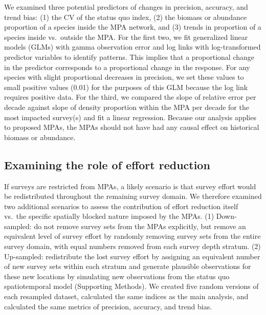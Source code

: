 \documentclass[12pt]{article}
\begin{document}
We examined three potential predictors of changes in precision, accuracy, and trend bias:
(1) the CV of the status quo index, (2) the biomass or abundance proportion of a species inside the MPA network, and (3) trends in proportion of a species inside vs.\ outside the MPA.
For the first two, we fit generalized linear models (GLMs) with gamma observation error and log links with log-transformed predictor variables to identify patterns.
This implies that a proportional change in the predictor corresponds to a proportional change in the response.
For any species with slight proportional decreases in precision, we set these values to small positive values (0.01) for the purposes of this GLM because the log link requires positive data.
For the third, we compared the slope of relative error per decade against slope of density proportion within the MPA per decade for the most impacted survey(s) and fit a linear regression.
Because our analysis applies to proposed MPAs, the MPAs should not have had any causal effect on historical biomass or abundance.

\subsection*{Examining the role of effort reduction}

If surveys are restricted from MPAs, a likely scenario is that survey effort would be redistributed throughout the remaining survey domain.
We therefore examined two additional scenarios to assess the contribution of effort reduction itself vs.\ the specific spatially blocked nature imposed by the MPAs.
(1) Down-sampled: do not remove survey sets from the MPAs explicitly, but remove an equivalent level of survey effort by randomly removing survey sets from the entire survey domain, with equal numbers removed from each survey depth stratum.
(2) Up-sampled: redistribute the lost survey effort by assigning an equivalent number of new survey sets within each stratum and generate plausible observations for these new locations by simulating new observations from the status quo spatiotemporal model (Supporting Methods).
We created five random versions of each resampled dataset, calculated the same indices as the main analysis, and calculated the same metrics of precision, accuracy, and trend bias.

\end{document}
